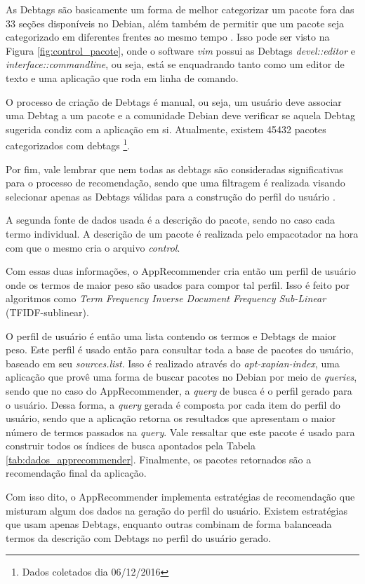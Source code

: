 As Debtags são basicamente um forma de melhor categorizar um pacote fora das 33
seções disponíveis no Debian, além também de permitir que um pacote seja
categorizado em diferentes frentes ao mesmo tempo \cite{zini2005cute}. Isso pode ser visto na Figura
\ref{fig:control_pacote}, onde o software \textit{vim} possui as Debtags
\textit{devel::editor} e \textit{interface::commandline}, ou seja, está se
enquadrando tanto como um editor de texto e uma aplicação que roda em linha de
comando.

O processo de criação de Debtags é manual, ou seja, um usuário deve associar uma
Debtag a um pacote e a comunidade Debian deve verificar se aquela Debtag
sugerida condiz com a aplicação em si. Atualmente, existem 45432 pacotes
categorizados com debtags \footnote{Dados
coletados dia 06/12/2016}.

Por fim, vale lembrar que nem todas as debtags são consideradas significativas
para o processo de recomendação, sendo que uma filtragem é realizada visando
selecionar apenas as Debtags válidas para a construção do perfil do usuário
\cite{araujo2011apprecommender}.

A segunda fonte de dados usada é a descrição do pacote, sendo no caso cada termo
individual. A descrição de um pacote é realizada pelo empacotador na hora com
que o mesmo cria o arquivo \textit{control}.

Com essas duas informações, o AppRecommender cria então um perfil de usuário
onde os termos de maior peso são usados para compor tal perfil. Isso é feito por
algoritmos como \textit{Term Frequency Inverse Document Frequency Sub-Linear}
(TFIDF-sublinear).

O perfil de usuário é então uma lista contendo os termos e Debtags de maior
peso. Este perfil é usado então para consultar toda a base de pacotes
do usuário, baseado em seu \textit{sources.list}.
Isso é realizado através do \textit{apt-xapian-index}, uma aplicação
que provê uma forma de buscar pacotes no Debian por meio de \textit{queries}, sendo que no
caso do AppRecommender, a \textit{query} de busca é o perfil gerado para o usuário. Dessa
forma, a \textit{query} gerada é composta por cada item do perfil do usuário, sendo que a
aplicação retorna os resultados que apresentam o maior número de termos passados
na \textit{query}.
Vale ressaltar que este pacote é usado para construir todos os índices de busca
apontados pela Tabela \ref{tab:dados_apprecommender}.
Finalmente, os pacotes retornados são a recomendação final da aplicação.

Com isso dito, o AppRecommender implementa estratégias de recomendação que
misturam algum dos dados na geração do perfil do usuário. Existem estratégias
que usam apenas Debtags, enquanto outras combinam de forma balanceada termos da
descrição com Debtags no perfil do usuário gerado.


